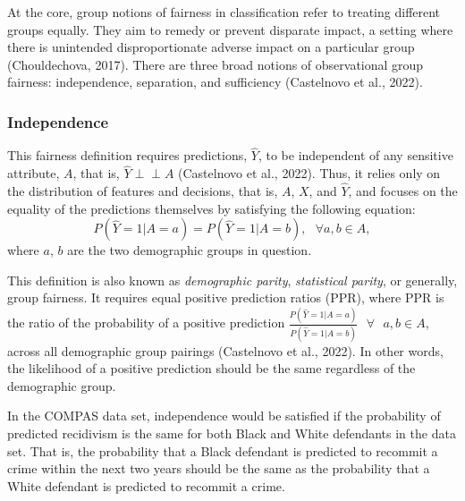 \documentclass[12pt, twoside]{amherstthesis}
\begin{document}
At the core, group notions of fairness in classification refer to treating different groups equally. They aim to remedy or prevent disparate impact, a setting where there is unintended disproportionate adverse impact on a particular group (Chouldechova, 2017). There are three broad notions of observational group fairness: independence, separation, and sufficiency (Castelnovo et al., 2022).

\hypertarget{independence}{%
\subsubsection{Independence}\label{independence}}

\newcommand{\indep}{\perp \!\!\! \perp}

This fairness definition requires predictions, \(\hat{Y}\), to be independent of any sensitive attribute, \(A\), that is, \(\hat{Y} \perp \!\!\! \perp A\) (Castelnovo et al., 2022). Thus, it relies only on the distribution of features and decisions, that is, \(A\), \(X\), and \(\hat{Y}\), and focuses on the equality of the predictions themselves by satisfying the following equation:
\begin{equation}
\label{ch1eq3}
P (\hat{Y} = 1 | A = a) = P (\hat{Y} = 1 | A = b), \text{    } \forall a, b \in A,
\end{equation}
where \(a\), \(b\) are the two demographic groups in question.

This definition is also known as \emph{demographic parity}, \emph{statistical parity}, or generally, group fairness. It requires equal positive prediction ratios (PPR), where PPR is the ratio of the probability of a positive prediction \(\frac{P(\hat{Y} = 1 | A = a)}{P(\hat{Y} = 1 | A = b)} \text{ } \forall \text{ } a, b \in A\), across all demographic group pairings (Castelnovo et al., 2022). In other words, the likelihood of a positive prediction should be the same regardless of the demographic group.

In the COMPAS data set, independence would be satisfied if the probability of predicted recidivism is the same for both Black and White defendants in the data set. That is, the probability that a Black defendant is predicted to recommit a crime within the next two years should be the same as the probability that a White defendant is predicted to recommit a crime.
\end{document}

